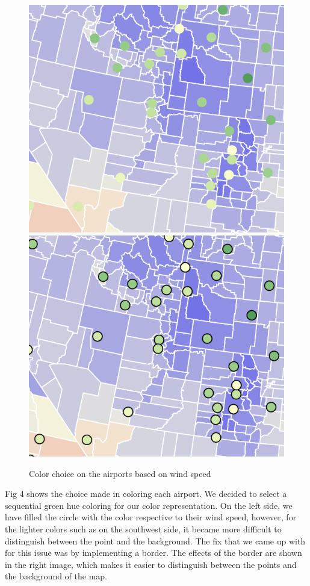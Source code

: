\documentclass[10pt,twocolumn,twoside]{opticajnl}
\begin{document}
\begin{figure}
    \centering
    \includegraphics[scale=0.45]{images/img5.png}
    \includegraphics[scale=0.45]{images/img4.png}
    \caption{Color choice on the airports based on wind speed}
\end{figure}

Fig 4 shows the choice made in coloring each airport. We decided to select a sequential green hue coloring for our color representation. On the left side, we have filled the circle with the color respective to their wind speed, however, for the lighter colors such as on the southwest side, it became more difficult to distinguish between the point and the background. The fix that we came up with for this issue was by implementing a border. The effects of the border are shown in the right image, which makes it easier to distinguish between the points and the background of the map.
\end{document}
